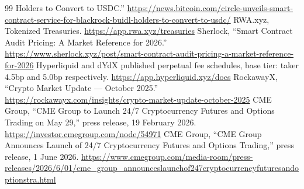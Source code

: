 \documentclass[11pt,a4paper]{article}
\begin{document}
\begin{thebibliography}{99}
Holders to Convert to USDC.'' \url{https://news.bitcoin.com/circle-unveils-smart-contract-service-for-blackrock-buidl-holders-to-convert-to-usdc/}
 RWA.xyz, Tokenized Treasuries. \url{https://app.rwa.xyz/treasuries}
 Sherlock, ``Smart Contract Audit Pricing: A Market Reference for 2026.''
\url{https://www.sherlock.xyz/post/smart-contract-audit-pricing-a-market-reference-for-2026}
 Hyperliquid and dYdX published perpetual fee schedules, base tier: taker 4.5bp and
5.0bp respectively. \url{https://app.hyperliquid.xyz/docs}
 RockawayX, ``Crypto Market Update --- October 2025.''
\url{https://rockawayx.com/insights/crypto-market-update-october-2025}
 CME Group, ``CME Group to Launch 24/7 Cryptocurrency Futures and Options Trading
on May 29,'' press release, 19 February 2026. \url{https://investor.cmegroup.com/node/54971}
 CME Group, ``CME Group Announces Launch of 24/7 Cryptocurrency Futures and
Options Trading,'' press release, 1 June 2026.
\url{https://www.cmegroup.com/media-room/press-releases/2026/6/01/cme_group_announceslaunchof247cryptocurrencyfuturesandoptionstra.html}
\end{thebibliography}
\end{document}
